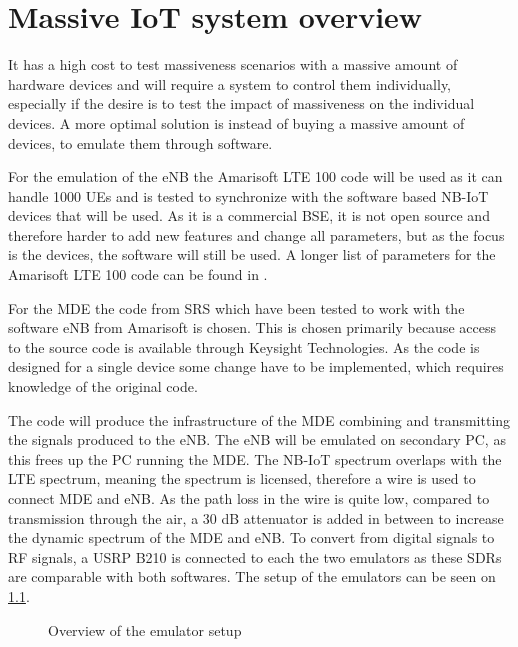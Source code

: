 \chapter{Massive IoT system overview}

It has a high cost to test massiveness scenarios with a massive amount of hardware devices and will require a system to control them individually, especially if the desire is to test the impact of massiveness on the individual devices. A more optimal solution is instead of buying a massive amount of devices, to emulate them through software.


For the emulation of the eNB the Amarisoft LTE 100 code will be used as it can handle 1000 \gls{UE}s \citep{Amarisoft_solutions} and is tested to synchronize with the software based NB-IoT devices that will be used. As it is a commercial BSE, it is not open source and therefore harder to add new features and change all parameters, but as the focus is the devices, the software will still be used. A longer list of parameters for the Amarisoft LTE 100 code can be found in .

For the \gls{MDE} the code from SRS which have been tested to work with the software eNB from Amarisoft is chosen. This is chosen primarily because access to the source code is available through Keysight Technologies. As the code is designed for a single device some change have to be implemented, which requires knowledge of the original code. 

The code will produce the infrastructure of the \gls{MDE} combining and transmitting the signals produced to the \gls{eNB}. The eNB will be emulated on secondary PC, as this frees up the PC running the \gls{MDE}. The NB-IoT spectrum overlaps with the LTE spectrum, meaning the spectrum is licensed, therefore a wire is used to connect \gls{MDE} and eNB. As the path loss in the wire is quite low, compared to transmission through the air, a 30 dB attenuator is added in between to increase the dynamic spectrum of the \gls{MDE} and eNB. To convert from digital signals to RF signals, a USRP B210 is connected to each the two emulators as these \gls{SDR}s are comparable with both softwares. The setup of the emulators can be seen on \ref{fig:MassSetup}.

\begin{figure}[H]
\centering
\resizebox{0.9\textwidth}{!}{
}
\caption{Overview of the emulator setup}
\label{fig:MassSetup}
\end{figure}



